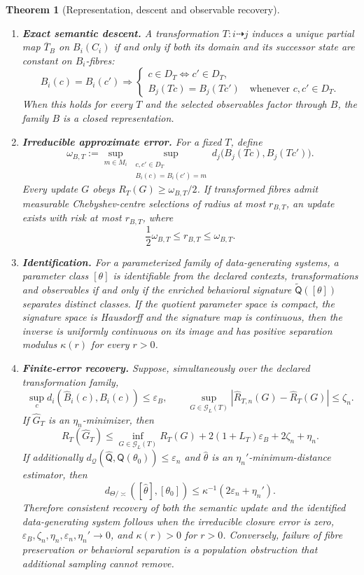 \documentclass[11pt]{article}
\newtheorem{theorem}[definition]{Theorem}
\begin{document}
{\begin{theorem}[Representation, descent and observable recovery]
\begin{enumerate}
\item[\textup{(II)}] \textbf{Exact semantic descent.} A transformation $T:i\dashrightarrow j$ induces a unique partial map $\overline T_B$ on $B_i(C_i)$ if and only if both its domain and its successor state are constant on $B_i$-fibres:
\[
B_i(c)=B_i(c')\Longrightarrow
\left\{
\begin{array}{l}
c\in D_T\Longleftrightarrow c'\in D_T,\\[2pt]
B_j(Tc)=B_j(Tc')\quad\text{whenever }c,c'\in D_T.
\end{array}\right.
\]
When this holds for every $T$ and the selected observables factor through $B$, the family $B$ is a closed representation.

\item[\textup{(III)}] \textbf{Irreducible approximate error.} For a fixed $T$, define
\[
\omega_{B,T}:=\sup_{m\in M_i}
\sup_{\substack{c,c'\in D_T\\B_i(c)=B_i(c')=m}}
d_j\bigl(B_j(Tc),B_j(Tc')\bigr).
\]
Every update $G$ obeys $R_T(G)\ge\omega_{B,T}/2$. If transformed fibres admit measurable Chebyshev-centre selections of radius at most $r_{B,T}$, an update exists with risk at most $r_{B,T}$, where
\[
\frac12\omega_{B,T}\le r_{B,T}\le\omega_{B,T}.
\]

\item[\textup{(IV)}] \textbf{Identification.} For a parameterized family of data-generating systems, a parameter class $[\theta]$ is identifiable from the declared contexts, transformations and observables if and only if the enriched behavioral signature $\widetilde{\mathsf Q}([\theta])$ separates distinct classes. If the quotient parameter space is compact, the signature space is Hausdorff and the signature map is continuous, then the inverse is uniformly continuous on its image and has positive separation modulus $\kappa(r)$ for every $r>0$.

\item[\textup{(V)}] \textbf{Finite-error recovery.} Suppose, simultaneously over the declared transformation family,
\[
\sup_c d_i(\widehat B_i(c),B_i(c))\le\varepsilon_B,
\qquad
\sup_{G\in\mathcal G_L(T)}
|\widehat R_{T,n}(G)-\widehat R_T(G)|\le\zeta_n.
\]
If $\widehat G_T$ is an $\eta_n$-minimizer, then
\[
R_T(\widehat G_T)
\le \inf_{G\in\mathcal G_L(T)}R_T(G)
+2(1+L_T)\varepsilon_B+2\zeta_n+\eta_n.
\]
If additionally $d_{\mathcal Q}(\widehat{\mathsf Q},\mathsf Q(\theta_0))\le\varepsilon_n$ and $\widehat\theta$ is an $\eta_n'$-minimum-distance estimator, then
\[
d_{\Theta/{\asymp}}([\widehat\theta],[\theta_0])
\le\kappa^{-1}(2\varepsilon_n+\eta_n').
\]
Therefore consistent recovery of both the semantic update and the identified data-generating system follows when the irreducible closure error is zero, $\varepsilon_B,\zeta_n,\eta_n,\varepsilon_n,\eta_n'\to0$, and $\kappa(r)>0$ for $r>0$. Conversely, failure of fibre preservation or behavioral separation is a population obstruction that additional sampling cannot remove.


\end{enumerate}
\end{theorem}}
\end{document}

